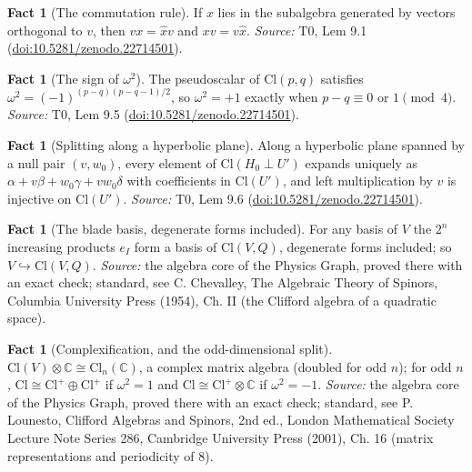 \documentclass[11pt]{article}
\theoremstyle{definition}
\newtheorem{fact}[theorem]{Fact}
\theoremstyle{plain}
\providecommand{\C}{}\renewcommand{\C}{\mathbb{C}}
\providecommand{\Cl}{}\renewcommand{\Cl}{\mathrm{Cl}}
\begin{document}
\begin{fact}[The commutation rule]\label{c:primer.commutation-rule}
If $x$ lies in the subalgebra generated by vectors orthogonal to $v$, then $v x = \hat{x} v$ and $x v = v \hat{x}$.
\emph{Source:} T0, Lem 9.1 (\href{https://doi.org/10.5281/zenodo.22714501}{doi:10.5281/zenodo.22714501}).
\end{fact}

\begin{fact}[The sign of $\omega^2$]\label{c:primer.sign}
The pseudoscalar of $\Cl(p,q)$ satisfies $\omega^{2} = (-1)^{(p-q)(p-q-1)/2}$, so $\omega^{2} = +1$ exactly when $p - q \equiv 0$ or $1 \pmod 4$.
\emph{Source:} T0, Lem 9.5 (\href{https://doi.org/10.5281/zenodo.22714501}{doi:10.5281/zenodo.22714501}).
\end{fact}

\begin{fact}[Splitting along a hyperbolic plane]\label{c:primer.splitting-along-hyperbolic-plane}
Along a hyperbolic plane spanned by a null pair $(v, w_0)$, every element of $\Cl(H_0 \perp U')$ expands uniquely as $\alpha + v\beta + w_0\gamma + v w_0\delta$ with coefficients in $\Cl(U')$, and left multiplication by $v$ is injective on $\Cl(U')$.
\emph{Source:} T0, Lem 9.6 (\href{https://doi.org/10.5281/zenodo.22714501}{doi:10.5281/zenodo.22714501}).
\end{fact}

\begin{fact}[The blade basis, degenerate forms included]\label{c:std-algebra.blade-basis}
For any basis of $V$ the $2^{n}$ increasing products $e_I$ form a basis of $\Cl(V, Q)$, degenerate forms included; so $V \hookrightarrow \Cl(V, Q)$.
\emph{Source:} the algebra core of the Physics Graph, proved there with an exact check; standard, see C. Chevalley, The Algebraic Theory of Spinors, Columbia University Press (1954), Ch. II (the Clifford algebra of a quadratic space).
\end{fact}

\begin{fact}[Complexification, and the odd-dimensional split]\label{c:std-algebra.complexification}
$\Cl(V) \otimes \C \cong \Cl_n(\C)$, a complex matrix algebra (doubled for odd $n$); for odd $n$, $\Cl \cong \Cl^{+} \oplus \Cl^{+}$ if $\omega^{2} = 1$ and $\Cl \cong \Cl^{+} \otimes \C$ if $\omega^{2} = -1$.
\emph{Source:} the algebra core of the Physics Graph, proved there with an exact check; standard, see P. Lounesto, Clifford Algebras and Spinors, 2nd ed., London Mathematical Society Lecture Note Series 286, Cambridge University Press (2001), Ch. 16 (matrix representations and periodicity of 8).
\end{fact}
\end{document}

